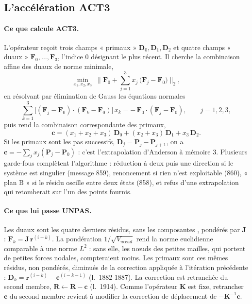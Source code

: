 \documentclass[11pt,a4paper]{article}
\numberwithin{equation}{section}
\newcommand{\src}[1]{\texttt{\detokenize{#1}}}          %
\newcommand{\lig}[1]{l.~#1}
\newcommand{\vc}[1]{\symbf{#1}}                         %
\begin{document}
\subsection{L'accélération ACT3}
\label{sec:act3}

\paragraph{Ce que calcule ACT3.}
L'opérateur reçoit trois champs « primaux » $\vc D_0, \vc D_1, \vc D_2$ et quatre champs « duaux » $\vc F_0, \dots, \vc F_3$, l'indice 0 désignant le plus récent.
Il cherche la combinaison affine des duaux de norme minimale,
\begin{equation}
\min_{x_1, x_2, x_3}\;\Big\lVert \vc F_0 + \sum_{j=1}^{3} x_j\,\big(\vc F_j - \vc F_0\big)\Big\rVert_2 ,
\end{equation}
en résolvant par élimination de Gauss les équations normales
\begin{equation}
\sum_{k=1}^{3} \big[(\vc F_j - \vc F_0)\cdot(\vc F_k - \vc F_0)\big]\,x_k = -\,\vc F_0\cdot(\vc F_j - \vc F_0),\qquad j = 1, 2, 3,
\end{equation}
puis rend la combinaison correspondante des primaux,
\begin{equation}
\vc c = (x_1 + x_2 + x_3)\,\vc D_0 + (x_2 + x_3)\,\vc D_1 + x_3\,\vc D_2 .
\end{equation}
Si les primaux sont les pas successifs, $\vc D_j = \vc P_j - \vc P_{j+1}$, on a $\vc c = -\sum_j x_j(\vc P_j - \vc P_0)$ : c'est l'extrapolation d'Anderson à mémoire 3.
Plusieurs garde-fous complètent l'algorithme : réduction à deux puis une direction si le système est singulier (message 859), renoncement si rien n'est exploitable (860), « plan B » si le résidu oscille entre deux états (858), et refus d'une extrapolation qui retomberait sur l'un des points fournis.

\paragraph{Ce que lui passe UNPAS.}
Les duaux sont les quatre derniers résidus, sans les composantes \src{FLX}, pondérés par $\vc J$ :
$\vc F_k = \vc J\,\vc r^{(i-k)}$.
La pondération $1/\sqrt{V_{nœud}}$ rend la norme euclidienne comparable à une norme $L^2$ : sans elle, les nœuds des petites mailles, qui portent de petites forces nodales, compteraient moins.
Les primaux sont ces mêmes résidus, non pondérés, diminués de la correction appliquée à l'itération précédente : $\vc D_k = \vc r^{(i-k)} - \vc c^{(i-k-1)}$ (\lig{1882-1887}).
La correction est retranchée du second membre, $\vc R \gets \vc R - \vc c$ (\lig{1914}).
Comme l'opérateur $\vc K$ est fixe, retrancher $\vc c$ du second membre revient à modifier la correction de déplacement de $-\vc K^{-1}\vc c$.
\end{document}
